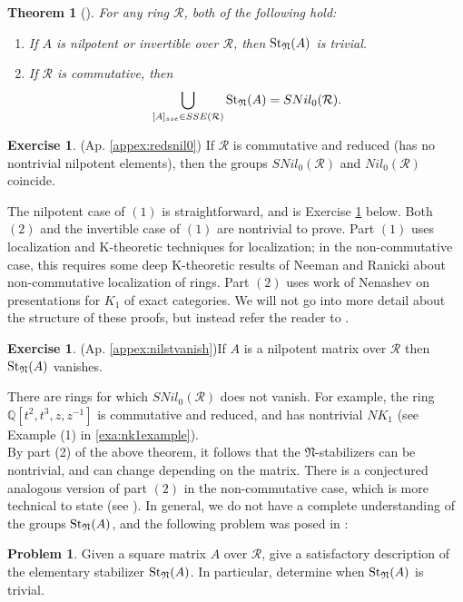 \documentclass{amsart}
\newtheorem{thm}[equation]{Theorem}
\theoremstyle{definition}
\newtheorem{exer}[equation]{Exercise}
\newtheorem{prob}[equation]{Problem}
\theoremstyle{definition}
\newcommand{\apr}{(Ap. \ref}
\newcommand{\calR}{\mathcal{R}}
\newcommand{\sta}{\textnormal{St}}
\numberwithin{equation}{subsection}
\begin{document}
\begin{thm}[{\cite[Theorems 4.7, 5.1]{BoSc1}}]\label{thm:stabilizerthm1}
For any ring $\calR$, both of the following hold:
\begin{enumerate}
\item
If $A$ is nilpotent or invertible over $\calR$, then $\sta_{\mathfrak{N}}(A)$ is trivial.
\item
If $\calR$ is commutative, then
$$\bigcup_{[A]_{sse} \in SSE(\calR)} \sta_{\mathfrak{N}}(A) = SNil_{0}(\calR).$$
\end{enumerate}
\end{thm}

\begin{exer}\apr{appex:redsnil0})
If $\calR$ is commutative and reduced (has no nontrivial nilpotent elements), then the groups $SNil_{0}(\calR)$ and $Nil_{0}(\calR)$ coincide.
\end{exer}

The nilpotent case of $(1)$ is straightforward, and is Exercise \ref{exer:nilpotentstavanishexer} below. Both $(2)$ and the invertible case of $(1)$ are nontrivial to prove. Part $(1)$ uses localization and K-theoretic techniques for localization; in the non-commutative case, this requires some deep K-theoretic results of Neeman and Ranicki about non-commutative localization of rings. Part $(2)$ uses work of Nenashev on presentations for $K_{1}$ of exact categories. We will not go into more detail about the structure of these proofs, but instead refer the reader to \cite{BoSc1}.

\begin{exer}\apr{appex:nilstvanish})\label{exer:nilpotentstavanishexer}
If $A$ is a nilpotent matrix over $\calR$ then $\sta_{\mathfrak{N}}(A)$ vanishes.
\end{exer}

There are rings for which $SNil_{0}(\calR)$ does not vanish. For example, the ring $\mathbb{Q}[t^{2},t^{3},z,z^{-1}]$ is commutative and reduced, and has nontrivial $NK_{1}$ (see Example (1) in \ref{exa:nk1example}).\\

By part (2) of the above theorem, it follows that the $\mathfrak{N}$-stabilizers can be nontrivial, and can change depending on the matrix. There is a conjectured analogous version of part $(2)$ in the non-commutative case, which is more technical to state (see \cite[Conjecture 5.20]{BoSc1}). In general, we do not have a complete understanding of the groups $\sta_{\mathfrak{N}}(A)$, and the following problem was posed in \cite[Problem 5.21]{BoSc1}:
\begin{prob}\label{prob:elementarystabl}
Given a square matrix $A$ over $\calR$, give a satisfactory description of the elementary stabilizer $\sta_{\mathfrak{N}}(A)$. In particular, determine when $\sta_{\mathfrak{N}}(A)$ is trivial.
\end{prob}
\end{document}
